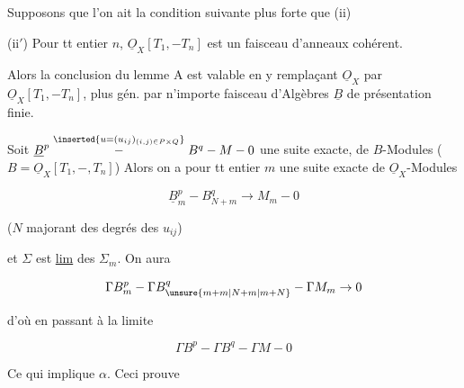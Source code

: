    Supposons que l'on ait la condition  suivante plus forte que (ii)

(ii$'$)  Pour tt entier $n$, $\underline O_X[T_1,-T_n]$ est un faisceau d'anneaux cohérent.


Alors la conclusion du lemme A est valable en y remplaçant $\underline O_X$ par $\underline O_X[T_1,-T_n]$, plus gén. par n'importe  faisceau d'Algèbres $\underline B$ de présentation finie.

Soit $\underline B^p\mathrel{\overset{\inserted{u=(u_{ij})_{(i,j)\in P\times Q}}}{-}}B^q-M-0$ une suite exacte, \inserted{$\Sigma$}  de $B$-Modules ($B=\underline O_X[T_1,-,T_n]$) Alors on a pour tt entier $m$ une suite exacte  de $\underline O_X$-Modules 

\[
 \underline B_m^p - B_{N+m}^q\to M_m-0
\]

($N$ majorant des degrés des $u_{ij}$)

 et $\Sigma$ est \uline{lim} des $\Sigma_m$. On aura

\[
 \Gamma B_m^p - \Gamma B_{\unsure{m+m|N+m|m+N}}^q - \Gamma M_m\to0
\]

d'où en passant à la limite

\[
 \Gamma B^p - \Gamma B^q - \Gamma M-0
\]

Ce qui implique $\alpha$.  Ceci prouve

